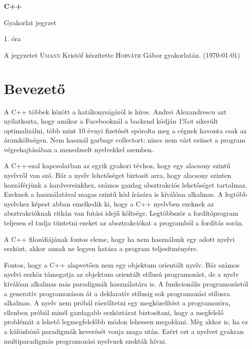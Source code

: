 \documentclass[a4paper,11.5pt,table]{article}
\begin{document}
	\setlength\parindent{0pt}
	\def\<{<\hspace{0mm}<}
	
	\theoremstyle{definition}
	\newtheorem{note}{Megjegyzés}[subsection]
	
	\begin{center}
		{\LARGE\textbf{C++}}
		
		{\Large Gyakorlat jegyzet}
		
		1. óra
	\end{center}
	A jegyzetet \textsc{Umann} Kristóf készítette \textsc{Horváth} Gábor gyakorlatán. (\today)
	\section{Bevezető}
	A C++ többek között a hatákonyságáról is híres. Andrei Alexandrescu azt nyilatkozta, hogy amikor a Facebooknál a backend kódján 1\%ot sikerült optimalizálni, több mint 10 évnyi fizetését spórolta meg a cégnek havonta csak az áramköltségen. Nem használ garbage collectort: nincs nem várt szünet a program végrehajtásában a menedzselt nyelvekkel szemben.

  A C++-szal kapcsolatban az egyik gyakori tévhoz, hogy egy alacsony szintű nyelvről van szó. Bár a nyelv lehetőséget biztosít arra, hogy alacsony szinten hozzáférjünk a hardvereinkhez, számos gazdag absztrakciós lehetőséget tartalmaz. Ezeknek a használatával magas szintű kód írására is kíválóan alkalmas. A legtöbb nyelvhez képest abban emelkedik ki, hogy a C++ nyelvben ezeknek az absztrakcióknak ritkán van futási idejű költsége. Legtöbbször a fordítóprogram teljesen el tudja tüntetni ezeket az absztrakciókat a programból a fordítás során.

  A C++ filozófiájának fontos eleme, hogy ha nem használunk egy adott nyelvi eszközt, akkor annak ne legyen hatása a program teljesítményére.

  Fontos, hogy a C++ alapvetően nem egy objektum orientált nyelv. Bár számos nyelvi eszköz támogatja az objektum orientált stílusú programozást, de a nyelv kíválóan alkalmas más paradigmák használatára is. A funkcionális programozástól a generatív programozáson át a deklaratív stílusig sok programozási stílusra alkalmas. A nyelv nem próbál ráerőltetni egy megközelítést a programozóra, ellenben próbál minél gazdagabb eszköztárat biztosítani, hogy a megfelelő problémát a lehető legmegfelelőbb módon lehessen megoldani. Még akkor is, ha ez a különböző paradigmák keverését vonja maga után. Ezért ezt a nyelvet gyakran multiparadigmás programozási nyelvnek szokták hívni. 
	
\end{document}
